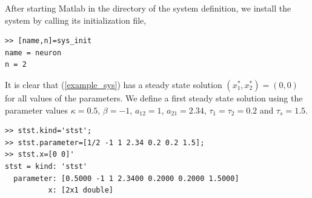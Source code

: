 \documentclass[10pt]{article}
\begin{document}
{After starting Matlab in the directory of the system definition,
we install the system by calling its initialization file,
{\small\begin{verbatim}
>> [name,n]=sys_init
name = neuron
n = 2
\end{verbatim}}
It is clear that (\ref{example_sys}) has a steady state
solution $(x_1^*,x_2^*)=(0,0)$ for all values of the parameters.
We define a first steady state solution using the
parameter values $\kappa=0.5$, $\beta=-1$, $a_{12}=1$,
$a_{21}=2.34$, $\tau_1=\tau_2=0.2$ and $\tau_s=1.5$.
{\small\begin{verbatim}
>> stst.kind='stst';
>> stst.parameter=[1/2 -1 1 2.34 0.2 0.2 1.5];
>> stst.x=[0 0]'
stst = kind: 'stst'
  parameter: [0.5000 -1 1 2.3400 0.2000 0.2000 1.5000]
          x: [2x1 double]
\end{verbatim}}
\begin{figure}[h]
\begin{center}

\end{center}
\end{figure}}
\end{document}
